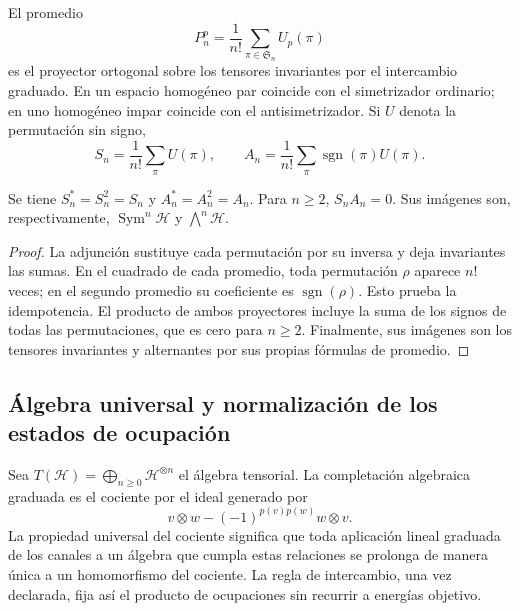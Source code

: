 El promedio
\[
 P_n^p=\frac1{n!}\sum_{\pi\in\mathfrak S_n}U_p(\pi)
\]
es el proyector ortogonal sobre los tensores invariantes por el
intercambio graduado. En un espacio homogéneo par coincide con el
simetrizador ordinario; en uno homogéneo impar coincide con el
antisimetrizador. Si \(U\) denota la permutación sin signo,
\begin{equation}
 S_n=\frac1{n!}\sum_\pi U(\pi),\qquad
 A_n=\frac1{n!}\sum_\pi\operatorname{sgn}(\pi)U(\pi).
 \label{vi:vi:eq:simetrizadores-fock}
\end{equation}

\begin{proposition}
\label{vi:vi:prop:proyectores-fock}
Se tiene \(S_n^*=S_n^2=S_n\) y \(A_n^*=A_n^2=A_n\).
Para \(n\ge2\), \(S_nA_n=0\). Sus imágenes son, respectivamente,
\(\operatorname{Sym}^n\mathcal H\) y \(\bigwedge^n\mathcal H\).
\end{proposition}
\begin{proof}
La adjunción sustituye cada permutación por su inversa y deja
invariantes las sumas. En el cuadrado de cada promedio, toda
permutación \(\rho\) aparece \(n!\) veces; en el segundo promedio
su coeficiente es \(\operatorname{sgn}(\rho)\). Esto prueba
la idempotencia. El producto de ambos proyectores incluye la suma
de los signos de todas las permutaciones, que es cero para
\(n\ge2\). Finalmente, sus imágenes son los tensores invariantes
y alternantes por sus propias fórmulas de promedio.
\end{proof}

\subsection{Álgebra universal y normalización de los estados de ocupación}
\label{vi:vi:subsec:fock-construccion}

Sea \(T(\mathcal H)=\bigoplus_{n\ge0}\mathcal H^{\otimes n}\)
el álgebra tensorial. La completación algebraica graduada es el
cociente por el ideal generado por
\begin{equation}
 v\otimes w-(-1)^{p(v)p(w)}w\otimes v.
 \label{vi:vi:eq:ideal-fock}
\end{equation}
La propiedad universal del cociente significa que toda aplicación
lineal graduada de los canales a un álgebra que cumpla estas
relaciones se prolonga de manera única a un homomorfismo del
cociente. La regla de intercambio, una vez declarada, fija así el
producto de ocupaciones sin recurrir a energías objetivo.

